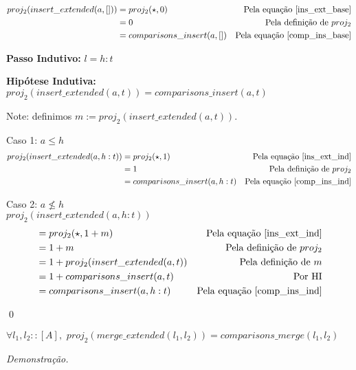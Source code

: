 \documentclass[12pt, oneside, a4paper,english,brazil]{abntex2}
\begin{document}
\begin{align*}
  proj_{2}(insert\_extended(a, [])) &= proj_{2}(\star, 0) &\text{Pela equa\c{c}\~ao \ref{ins_ext_base}}\\
                                 &= 0 &\text{Pela defini\c{c}\~ao de } proj_{2} \\
  &= comparisons\_insert(a, []) &\text{Pela equa\c{c}\~ao \ref{comp_ins_base}}
\end{align*}

\textbf{Passo Indutivo: } $l = h : t$

\textbf{Hip\'otese Indutiva: } $proj_{2}(insert\_extended(a, t)) = comparisons\_insert(a, t)$

Note: definimos $m := proj_{2}(insert\_extended(a, t))$.

Caso 1: $a \le h$
\begin{align*}
  proj_{2}(insert\_extended(a, h : t)) &= proj_{2}(\star, 1) &\text{Pela equa\c{c}\~ao \ref{ins_ext_ind}}\\
                                       &= 1 &\text{Pela defini\c{c}\~ao de } proj_{2} \\
  &= comparisons\_insert(a, h : t) &\text{Pela equa\c{c}\~ao \ref{comp_ins_ind}}
\end{align*}

Caso 2: $a \not\le h$ \\

$proj_{2}(insert\_extended(a, h : t))$
\begin{align*}
  &= proj_{2}(\star, 1 + m) &\text{Pela equa\c{c}\~ao \ref{ins_ext_ind}} \\
                                    &= 1 + m &\text{Pela defini\c{c}\~ao de } proj_{2} \\
                                    &= 1 + proj_{2}(insert\_extended(a, t)) &\text{Pela defini\c{c}\~ao de } m\\
                                    &= 1 + comparisons\_insert(a, t) &\text{Por HI} \\
  &= comparisons\_insert(a, h : t) &\text{Pela equa\c{c}\~ao \ref{comp_ins_ind}}
\end{align*}

\qed

\begin{teorema}
  $\forall l_{1}, l_{2} :: [A], \,\, proj_{2}(merge\_extended(l_{1}, l_{2})) = comparisons\_merge(l_{1}, l_{2})$
\end{teorema}

\noindent \textit{Demonstra\c{c}\~ao.}
\end{document}
